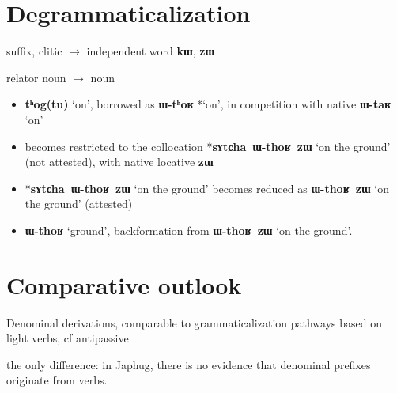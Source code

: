 \documentclass[oldfontcommands,oneside,a4paper,11pt]{article}
\newcommand{\ipa}[1]{\mbox{\phon\textbf{#1}}} %
\begin{document}
 \section{Degrammaticalization}
 
 suffix, clitic $\rightarrow$ independent word
\ipa{kɯ}, \ipa{zɯ}

relator noun $\rightarrow$ noun 



\begin{itemize}
\item \ipa{tʰog(tu)} `on', borrowed as \ipa{ɯ-tʰoʁ} *`on', in competition with native \ipa{ɯ-taʁ} `on'
\item becomes restricted to the collocation *\ipa{sɤtɕha ɯ-thoʁ zɯ} `on the ground' (not attested), with native locative \ipa{zɯ}
\item *\ipa{sɤtɕha ɯ-thoʁ zɯ} `on the ground' becomes reduced as \ipa{ɯ-thoʁ zɯ} `on the ground' (attested)
\item  \ipa{ɯ-thoʁ} `ground', backformation from \ipa{ɯ-thoʁ zɯ} `on the ground'.
\end{itemize}
 
 
    \section{Comparative outlook} 

Denominal derivations, comparable to grammaticalization pathways based on light verbs, cf antipassive \citealt{creissels12antip}

the only difference: in Japhug, there is no evidence that denominal prefixes originate from verbs.





\end{document}
